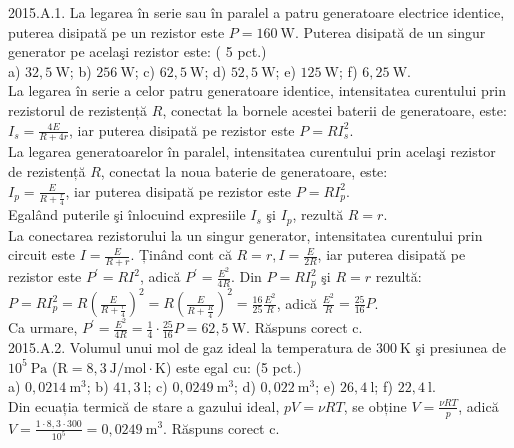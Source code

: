 2015.A.1. La legarea în serie sau în paralel a patru generatoare electrice identice, puterea disipată pe un rezistor este $P=160 \mathrm{~W}$. Puterea disipată de un singur generator pe acelaşi rezistor este: ( 5 pct.)\\ a) $32,5 \mathrm{~W}$; b) $256 \mathrm{~W}$; c) $62,5 \mathrm{~W}$; d) $52,5 \mathrm{~W}$; e) $125 \mathrm{~W}$; f) $6,25 \mathrm{~W}$.\\ La legarea în serie a celor patru generatoare identice, intensitatea curentului prin rezistorul de rezistență $R$, conectat la bornele acestei baterii de generatoare, este:\\ $I_{s}=\frac{4 E}{R+4 r}$, iar puterea disipată pe rezistor este $P=R I_{s}^{2}$.\\ La legarea generatoarelor în paralel, intensitatea curentului prin acelaşi rezistor de rezistență $R$, conectat la noua baterie de generatoare, este:\\ $I_{p}=\frac{E}{R+\frac{r}{4}}$, iar puterea disipată pe rezistor este $P=R I_{p}^{2}$.\\ Egalând puterile şi înlocuind expresiile $I_{s}$ şi $I_{p}$, rezultă $R=r$.\\ La conectarea rezistorului la un singur generator, intensitatea curentului prin circuit este $I=\frac{E}{R+r}$. Ținând cont că $R=r, I=\frac{E}{2 R}$, iar puterea disipată pe rezistor este $P^{\prime}=R I^{2}$, adică $P^{\prime}=\frac{E^{2}}{4 R}$. Din $P=R I_{p}^{2}$ şi $R=r$ rezultă:\\ $P=R I_{p}^{2}=R\left(\frac{E}{R+\frac{r}{4}}\right)^{2}=R\left(\frac{E}{R+\frac{R}{4}}\right)^{2}=\frac{16}{25} \frac{E^{2}}{R}$, adică $\frac{E^{2}}{R}=\frac{25}{16} P$.\\ Ca urmare, $P^{\prime}=\frac{E^{2}}{4 R}=\frac{1}{4} \cdot \frac{25}{16} P=62,5 \mathrm{~W}$. Răspuns corect c.\\

2015.A.2. Volumul unui mol de gaz ideal la temperatura de $300 \mathrm{~K}$ şi presiunea de $10^{5} \mathrm{~Pa}$ ($\mathrm{R}=8,3 \mathrm{~J} / \mathrm{mol} \cdot \mathrm{K}$) este egal cu: (5 pct.)\\ a) $0,0214 \mathrm{~m}^{3}$; b) $41,3 \mathrm{~l}$; c) $0,0249 \mathrm{~m}^{3}$; d) $0,022 \mathrm{~m}^{3}$; e) $26,4 \mathrm{~l}$; f) $22,4 \mathrm{~l}$.\\ Din ecuația termică de stare a gazului ideal, $p V=\nu R T$, se obține $V=\frac{\nu R T}{p}$, adică $V=\frac{1 \cdot 8,3 \cdot 300}{10^{5}}=0,0249 \mathrm{~m}^{3}$. Răspuns corect c.\\

